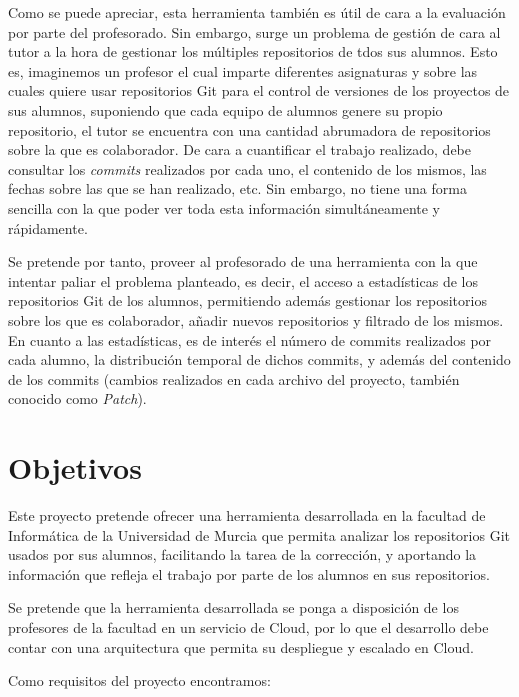 Como se puede apreciar, esta herramienta también es útil de cara a la
evaluación por parte del profesorado. Sin embargo, surge un problema de
gestión de cara al tutor a la hora de gestionar los múltiples repositorios
de tdos sus alumnos. Esto es, imaginemos un profesor el cual imparte
diferentes asignaturas y sobre las cuales quiere usar repositorios Git para
el control de versiones de los proyectos de sus alumnos, suponiendo que
cada equipo de alumnos genere su propio repositorio, el tutor se encuentra
con una cantidad abrumadora de repositorios sobre la que es colaborador. De
cara a cuantificar el trabajo realizado, debe consultar los \emph{commits}
realizados por cada uno, el contenido de los mismos, las fechas sobre las
que se han realizado, etc. Sin embargo, no tiene una forma sencilla con la
que poder ver toda esta información simultáneamente y rápidamente.

Se pretende por tanto, proveer al profesorado de una herramienta con la que
intentar paliar el problema planteado, es decir, el acceso a estadísticas
de los repositorios Git de los alumnos, permitiendo además gestionar los
repositorios sobre los que es colaborador, añadir nuevos repositorios y
filtrado de los mismos. En cuanto a las estadísticas, es de interés el
número de commits realizados por cada alumno, la distribución temporal de
dichos commits, y además del contenido de los commits (cambios realizados
en cada archivo del proyecto, también conocido como \textit{Patch}).

\section{Objetivos}

Este proyecto pretende ofrecer una herramienta desarrollada en la facultad
de Informática de la Universidad de Murcia que permita analizar los
repositorios Git usados por sus alumnos, facilitando
la tarea de la corrección, y aportando la información que refleja el
trabajo por parte de los alumnos en sus repositorios.

Se pretende que la herramienta desarrollada se ponga a disposición de los
profesores de la facultad en un servicio de Cloud, por lo que el desarrollo
debe contar con una arquitectura que permita su despliegue y escalado en
Cloud.

Como requisitos del proyecto encontramos:

